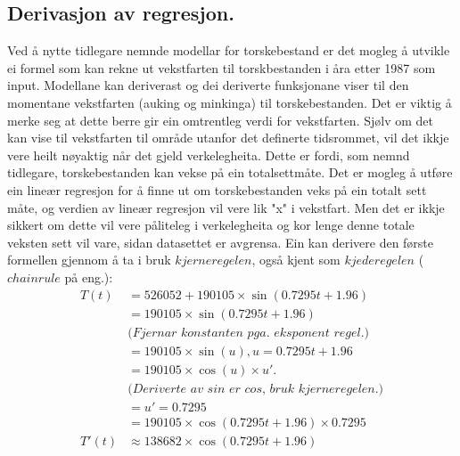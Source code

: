 \documentclass{report}
\begin{document}
\subsection{Derivasjon av regresjon.}
Ved å nytte tidlegare nemnde modellar for torskebestand er det mogleg å utvikle ei formel som kan rekne ut vekstfarten til torskbestanden i åra etter 1987 som input.
Modellane kan deriverast og dei deriverte funksjonane viser til den momentane vekstfarten (auking og minkinga) til torskebestanden.
Det er viktig å merke seg at dette berre gir ein omtrentleg verdi for vekstfarten.
Sjølv om det kan vise til vekstfarten til område utanfor det definerte tidsrommet, vil det ikkje vere heilt nøyaktig når det gjeld verkelegheita. Dette er fordi, som nemnd tidlegare, torskebestanden kan vekse på ein totalsettmåte.
Det er mogleg å utføre ein lineær regresjon for å finne ut om torskebestanden veks på ein totalt sett måte, og verdien av lineær regresjon vil vere lik "x" i vekstfart. Men det er ikkje sikkert om dette vil vere påliteleg i verkelegheita og kor lenge denne totale veksten sett vil vare, sidan datasettet er avgrensa.
Ein kan derivere den første formellen gjennom å ta i bruk $kjerneregelen$, også kjent som $kjederegelen$ ($chainrule$ på eng.):
\begin{align*}
	T(t)  & = 526052+190105\times \sin(0.7295t+1.96)                \\
	      & = 190105 \times \sin(0.7295t+1.96)                      \\
	      & \textit{(Fjernar konstanten pga. eksponent regel.)}     \\
	      & = 190105 \times \sin(u), u=0.7295t+1.96                 \\
	      & = 190105 \times \cos(u) \times u'.                      \\
	      & \textit{(Deriverte av sin er cos, bruk kjerneregelen.)} \\
	      & = u' = 0.7295                                           \\
	      & = 190105 \times \cos(0.7295t+1.96)\times 0.7295         \\
	T'(t) & \approx 138682 \times \cos(0.7295t+1.96)
\end{align*}
\end{document}
